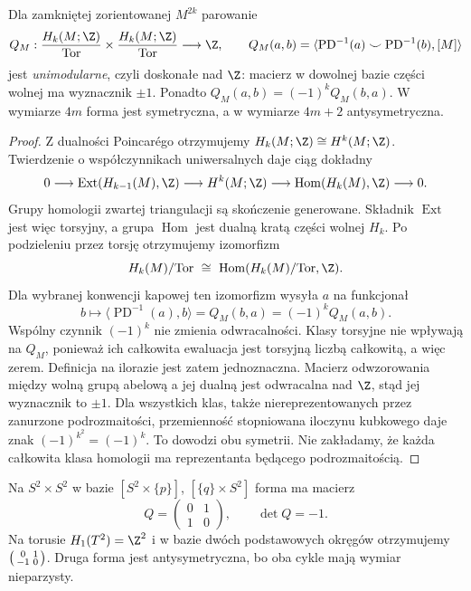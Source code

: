 \begin{twierdzenie}
\label{thm:forma-przeciecia-16}
Dla zamkniętej
zorientowanej
$M^{2k}$ parowanie
\[
 Q_M:
 \frac{H_k(M;\Z)}{\mathrm{Tor}}
 \times
 \frac{H_k(M;\Z)}{\mathrm{Tor}}
   \longrightarrow\Z,
 \qquad
 Q_M(a,b)=
 \langle\operatorname{PD}^{-1}(a)
 \smile\operatorname{PD}^{-1}(b),[M]\rangle
\]
jest \emph{unimodularne}, czyli doskonałe nad $\Z$:
macierz w dowolnej bazie
części wolnej ma wyznacznik
$\pm1$. Ponadto
$Q_M(a,b)=(-1)^kQ_M(b,a)$.
W wymiarze $4m$ forma
jest symetryczna, a
w wymiarze $4m+2$
antysymetryczna.
\end{twierdzenie}
\begin{proof}
Z dualności Poincarégo
otrzymujemy
$H_k(M;\Z)\cong H^k(M;\Z)$.
Twierdzenie o
współczynnikach
uniwersalnych daje
ciąg dokładny
\[
0\longrightarrow
 \operatorname{Ext}
     (H_{k-1}(M),\Z)
 \longrightarrow H^k(M;\Z)
 \longrightarrow
 \operatorname{Hom}(H_k(M),\Z)
 \longrightarrow0.
\]
Grupy homologii
zwartej triangulacji
są skończenie
generowane.
Składnik $\operatorname{Ext}$
jest więc torsyjny,
a grupa $\operatorname{Hom}$
jest dualną kratą
części wolnej $H_k$.
Po podzieleniu przez
torsję otrzymujemy
izomorfizm
\[
 H_k(M)/\mathrm{Tor}
 \ \cong\
 \operatorname{Hom}
    (H_k(M)/\mathrm{Tor},\Z).
\]
Dla wybranej konwencji kapowej ten izomorfizm
wysyła $a$ na funkcjonał
\[
 b\longmapsto\langle\operatorname{PD}^{-1}(a),b\rangle
 =Q_M(b,a)=(-1)^kQ_M(a,b).
\]
Wspólny czynnik $(-1)^k$ nie zmienia odwracalności.
Klasy torsyjne nie wpływają na $Q_M$, ponieważ
ich całkowita ewaluacja jest torsyjną liczbą całkowitą,
a więc zerem. Definicja na ilorazie jest zatem jednoznaczna.
Macierz odwzorowania
między wolną grupą
abelową a jej dualną
jest odwracalna nad
$\Z$, stąd jej
wyznacznik to $\pm1$.
Dla wszystkich klas, także niereprezentowanych
przez zanurzone podrozmaitości, przemienność
stopniowana iloczynu kubkowego daje znak
$(-1)^{k^2}=(-1)^k$. To dowodzi obu symetrii.
Nie zakładamy, że każda całkowita klasa homologii
ma reprezentanta będącego podrozmaitością.
\end{proof}

\begin{przyklad}
Na $S^2\times S^2$
w bazie
$[S^2\times\{p\}]$,
$[\{q\}\times S^2]$
forma ma macierz
\[
 Q=
 \begin{pmatrix}
  0&1\\1&0
 \end{pmatrix},
 \qquad\det Q=-1.
\]
Na torusie
$H_1(T^2)=\Z^2$
i w bazie dwóch
podstawowych okręgów
otrzymujemy
$\begin{psmallmatrix}
0&1\\-1&0
\end{psmallmatrix}$.
Druga forma jest
antysymetryczna,
bo oba cykle mają
wymiar nieparzysty.
\end{przyklad}

